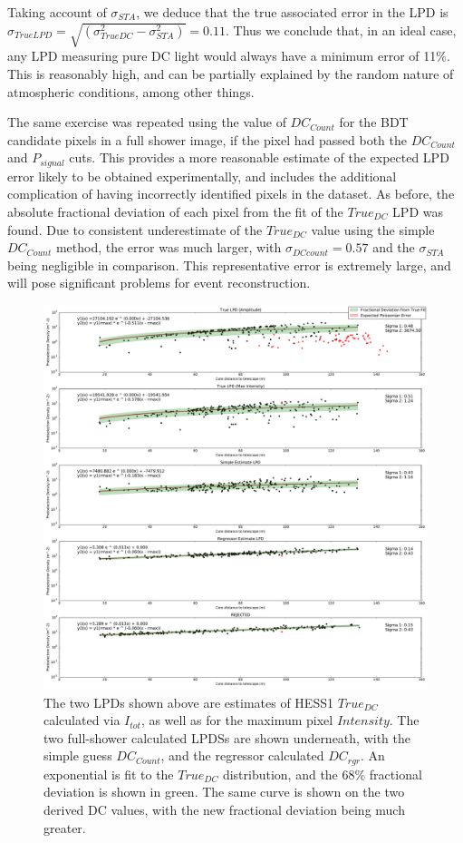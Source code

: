 \documentclass[11pt]{article}
\begin{document}
Taking account of $\sigma_{STA}$, we deduce that the true associated error in the LPD is $\sigma_{TrueLPD} = \sqrt{(\sigma_{TrueDC}^{2} - \sigma_{STA}^{2})} = 0.11$. Thus we conclude that, in an ideal case, any LPD measuring pure DC light would always have a minimum error of 11\%. This is reasonably high, and can be partially explained by the random nature of atmospheric conditions, among other things.

The same exercise was repeated using the value of $DC_{Count}$ for the BDT candidate pixels in a full shower image, if the pixel had passed both the $DC_{Count}$ and $P_{signal}$ cuts. This provides a more reasonable estimate of the expected LPD error likely to be obtained experimentally, and includes the additional complication of having incorrectly identified pixels in the dataset. As before, the absolute fractional deviation of each pixel from the fit of the $True_{DC}$ LPD was found. Due to consistent underestimate of the $True_{DC}$ value using the simple $DC_{Count}$ method, the error was much larger, with $\sigma_{DCcount}=0.57$ and the $\sigma_{STA}$ being negligible in comparison. This representative error is extremely large, and will pose significant problems for event reconstruction.

\begin{figure}
\begin{center}
\includegraphics[width=\textwidth]{corsikalpd1}
\caption{The two LPDs shown above are estimates of HESS1 $True_{DC}$ calculated via $I_{tot}$, as well as for the maximum pixel $Intensity$. The two full-shower calculated LPDSs are shown underneath, with the simple guess $DC_{Count}$, and the regressor calculated $DC_{rgr}$. An exponential is fit to the $True_{DC}$ distribution, and the 68\% fractional deviation is shown in green. The same curve is shown on the two derived DC values, with the new fractional deviation being much greater.}
\label{fig:corsikalpd1}
\end{center}
\end{figure}
\end{document}
